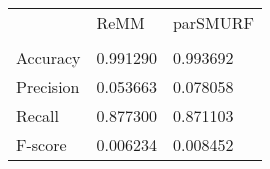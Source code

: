 \begin{table}
\begin{tabular}{lll}
\toprule
{} &      ReMM &  parSMURF \\
          &           &           \\
\midrule
Accuracy  &  0.991290 &  0.993692 \\
Precision &  0.053663 &  0.078058 \\
Recall    &  0.877300 &  0.871103 \\
F-score   &  0.006234 &  0.008452 \\
\bottomrule
\end{tabular}
\end{table}